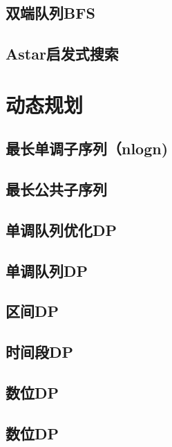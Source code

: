 \section{双端队列BFS}
\raggedbottom
\hrulefill
\section{Astar启发式搜索}
\raggedbottom
\hrulefill

\chapter{动态规划}
\section{最长单调子序列（nlogn)}
\raggedbottom
\hrulefill
\section{最长公共子序列}
\raggedbottom
\hrulefill
\section{单调队列优化DP}
\raggedbottom
\hrulefill
\section{单调队列DP}
\raggedbottom
\hrulefill
\section{区间DP}
\raggedbottom
\hrulefill
\section{时间段DP}
\raggedbottom
\hrulefill
\section{数位DP}
\raggedbottom
\hrulefill
\section{数位DP}
\raggedbottom
\hrulefill
